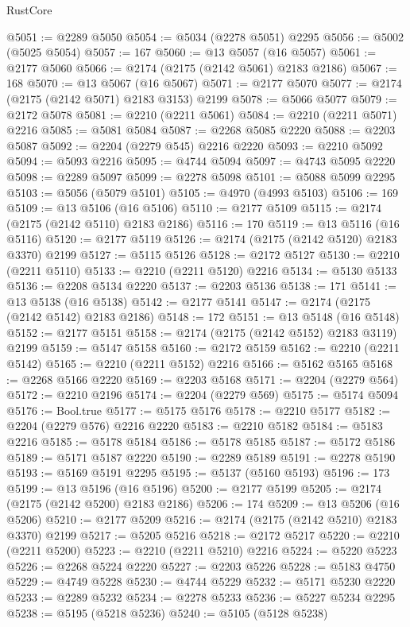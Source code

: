 \begin{lexlean}{RustCore}
\begin{coremodule}
@5051 := @2289 @5050
@5054 := @5034 (@2278 @5051) @2295
@5056 := @5002 (@5025 @5054)
@5057 := 167
@5060 := @13 @5057 (@16 @5057)
@5061 := @2177 @5060
@5066 := @2174 (@2175 (@2142 @5061) @2183 @2186)
@5067 := 168
@5070 := @13 @5067 (@16 @5067)
@5071 := @2177 @5070
@5077 := @2174 (@2175 (@2142 @5071) @2183 @3153) @2199
@5078 := @5066 @5077
@5079 := @2172 @5078
@5081 := @2210 (@2211 @5061)
@5084 := @2210 (@2211 @5071) @2216
@5085 := @5081 @5084
@5087 := @2268 @5085 @2220
@5088 := @2203 @5087
@5092 := @2204 (@2279 @545) @2216 @2220
@5093 := @2210 @5092
@5094 := @5093 @2216
@5095 := @4744 @5094
@5097 := @4743 @5095 @2220
@5098 := @2289 @5097
@5099 := @2278 @5098
@5101 := @5088 @5099 @2295
@5103 := @5056 (@5079 @5101)
@5105 := @4970 (@4993 @5103)
@5106 := 169
@5109 := @13 @5106 (@16 @5106)
@5110 := @2177 @5109
@5115 := @2174 (@2175 (@2142 @5110) @2183 @2186)
@5116 := 170
@5119 := @13 @5116 (@16 @5116)
@5120 := @2177 @5119
@5126 := @2174 (@2175 (@2142 @5120) @2183 @3370) @2199
@5127 := @5115 @5126
@5128 := @2172 @5127
@5130 := @2210 (@2211 @5110)
@5133 := @2210 (@2211 @5120) @2216
@5134 := @5130 @5133
@5136 := @2208 @5134 @2220
@5137 := @2203 @5136
@5138 := 171
@5141 := @13 @5138 (@16 @5138)
@5142 := @2177 @5141
@5147 := @2174 (@2175 (@2142 @5142) @2183 @2186)
@5148 := 172
@5151 := @13 @5148 (@16 @5148)
@5152 := @2177 @5151
@5158 := @2174 (@2175 (@2142 @5152) @2183 @3119) @2199
@5159 := @5147 @5158
@5160 := @2172 @5159
@5162 := @2210 (@2211 @5142)
@5165 := @2210 (@2211 @5152) @2216
@5166 := @5162 @5165
@5168 := @2268 @5166 @2220
@5169 := @2203 @5168
@5171 := @2204 (@2279 @564)
@5172 := @2210 @2196
@5174 := @2204 (@2279 @569)
@5175 := @5174 @5094
@5176 := Bool.true
@5177 := @5175 @5176
@5178 := @2210 @5177
@5182 := @2204 (@2279 @576) @2216 @2220
@5183 := @2210 @5182
@5184 := @5183 @2216
@5185 := @5178 @5184
@5186 := @5178 @5185
@5187 := @5172 @5186
@5189 := @5171 @5187 @2220
@5190 := @2289 @5189
@5191 := @2278 @5190
@5193 := @5169 @5191 @2295
@5195 := @5137 (@5160 @5193)
@5196 := 173
@5199 := @13 @5196 (@16 @5196)
@5200 := @2177 @5199
@5205 := @2174 (@2175 (@2142 @5200) @2183 @2186)
@5206 := 174
@5209 := @13 @5206 (@16 @5206)
@5210 := @2177 @5209
@5216 := @2174 (@2175 (@2142 @5210) @2183 @3370) @2199
@5217 := @5205 @5216
@5218 := @2172 @5217
@5220 := @2210 (@2211 @5200)
@5223 := @2210 (@2211 @5210) @2216
@5224 := @5220 @5223
@5226 := @2268 @5224 @2220
@5227 := @2203 @5226
@5228 := @5183 @4750
@5229 := @4749 @5228
@5230 := @4744 @5229
@5232 := @5171 @5230 @2220
@5233 := @2289 @5232
@5234 := @2278 @5233
@5236 := @5227 @5234 @2295
@5238 := @5195 (@5218 @5236)
@5240 := @5105 (@5128 @5238)

\end{coremodule}
\end{lexlean}

